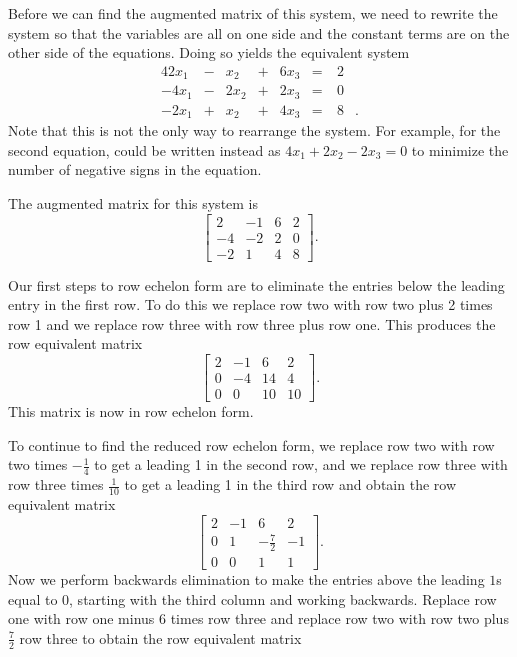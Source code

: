 \begin{example}
\ExampleSolution Before we can find the augmented matrix of this system, we need to rewrite the system so that the variables are all on one side and the constant terms are on the other side of the equations. Doing so yields the equivalent system
\begin{alignat*}{4}
{2}x_1 	&{}-{}		&{}x_2		&{}+{}	&{6}x_3	&{}={}	& \ 2&{}   \\
{-4}x_1	&{}-{} 		&{2}x_2 		&{}+{}	&{2}x_3	 &{}={} 	& \ 0&{} \\
{-2}x_1	&{}+{}		&{}x_2		&{}+{} 	&{4}x_3	&{}={} 	& \ 8&{.}
\end{alignat*}
Note that this is not the only way to rearrange the system. For example, for the second equation, could be written instead as $4x_1+2x_2-2x_3=0$ to minimize the number of negative signs in the equation. 
\ba
\item The augmented matrix for this system is 
\[\left[ \begin{array}{rrc|c} 2&-1&6&2 \\ -4&-2&2&0 \\ -2&1&4&8 \end{array} \right].\]
\item Our first steps to row echelon form are to eliminate the entries below the leading entry in the first row. To do this we replace row two with row two plus 2 times row 1 and we replace row three with row three plus row one. This produces the row equivalent matrix
\[\left[ \begin{array}{crc|c} 2&-1&6&2 \\ 0&-4&14&4 \\ 0&0&10&10 \end{array} \right].\]
This matrix is now in row echelon form. 
\item To continue to find the reduced row echelon form, we replace row two with row two times $-\frac{1}{4}$ to get a leading 1 in the second row, and we replace row three with row three times $\frac{1}{10}$ to get a leading 1 in the third row and obtain the row equivalent matrix
\[\renewcommand{\arraystretch}{1.4} \left[ \begin{array}{crr|r} 2&-1&6&2 \\ 0&1&-\frac{7}{2}&-1 \\ 0&0&1&1 \end{array} \right].\]
Now we perform backwards elimination to make the entries above the leading $1$s equal to $0$, starting with the third column and working backwards. Replace row one with row one minus $6$ times row three and replace row two with row two plus $\frac{7}{2}$ row three to obtain the row equivalent matrix

\end{example}
